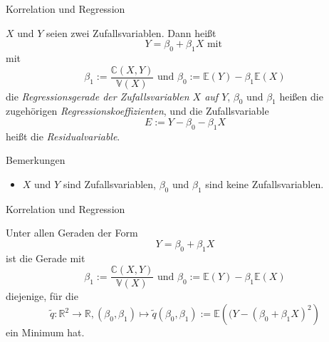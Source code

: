 \documentclass[
  8pt,
  ignorenonframetext,
]{beamer}
\providecommand{\tightlist}{%
  \setlength{\itemsep}{0pt}\setlength{\parskip}{0pt}}
\begin{document}
\begin{frame}{Korrelation und Regression}
\protect\hypertarget{korrelation-und-regression-1}{}
\small
\begin{definition}
\justifying
$X$ und $Y$ seien zwei Zufallsvariablen. Dann heißt
\begin{equation}
Y  = \beta_0 + \beta_1 X \mbox{ mit }
\end{equation}
mit
\begin{equation}
\beta_1 := \frac{\mathbb{C}(X,Y)}{\mathbb{V}(X)} \mbox{ und }\beta_0 := \mathbb{E}(Y) - \beta_1\mathbb{E}(X)
\end{equation}
die \textit{Regressionsgerade der Zufallsvariablen $X$ auf $Y$}, $\beta_0$ und
$\beta_1$ heißen die zugehörigen \textit{Regressionskoeffizienten}, und die
Zufallsvariable
\begin{equation}
E := Y - \beta_0 - \beta_1 X
\end{equation}
heißt die \textit{Residualvariable}.
\end{definition}

\footnotesize

Bemerkungen

\begin{itemize}
\tightlist
\item
  \(X\) und \(Y\) sind Zufallsvariablen, \(\beta_0\) und \(\beta_1\)
  sind keine Zufallsvariablen.
\end{itemize}
\end{frame}

\begin{frame}{Korrelation und Regression}
\protect\hypertarget{korrelation-und-regression-2}{}
\small
\begin{theorem}
\justifying
\normalfont
Unter allen Geraden der Form
\begin{equation}
Y  = \beta_0 + \beta_1 X
\end{equation}
ist die Gerade mit
\begin{equation}
\beta_1 := \frac{\mathbb{C}(X,Y)}{\mathbb{V}(X)} \mbox{ und } \beta_0 :=  \mathbb{E}(Y) - \beta_1\mathbb{E}(X)
\end{equation}
diejenige, für die
\begin{equation}
\tilde{q}: \mathbb{R}^2 \to \mathbb{R}, (\beta_0, \beta_1) \mapsto \tilde{q}(\beta_0,\beta_1) := \mathbb{E}\left((Y - (\beta_0 + \beta_1 X)^2\right)
\end{equation}
ein Minimum hat.
\end{theorem}
\end{frame}
\end{document}
